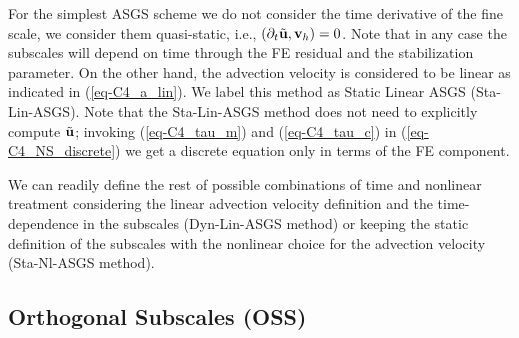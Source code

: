 For the simplest ASGS scheme we do not consider the time derivative of the fine scale, we consider them quasi-static, i.e., $(\partial_t\tilde{{\bf u}},{\bf v}_h)=0$. Note that in any case the subscales will depend on time through the FE residual and the stabilization parameter. On the other hand, the advection velocity is considered to be linear as indicated in (\ref{eq-C4_a_lin}). We label this method as Static Linear ASGS (Sta-Lin-ASGS). Note that the Sta-Lin-ASGS method does not need to explicitly compute $\tilde{{\bf u}}$; invoking (\ref{eq-C4_tau_m}) and (\ref{eq-C4_tau_c}) in (\ref{eq-C4_NS_discrete}) we get a discrete equation only in terms of the FE component.%

We can readily define the rest of possible combinations of time and nonlinear treatment considering the linear advection velocity definition and the time-dependence in the subscales (Dyn-Lin-ASGS method) or keeping the static definition of the subscales with the nonlinear choice for the advection velocity (Sta-Nl-ASGS method).

\subsection{Orthogonal Subscales (OSS)}

